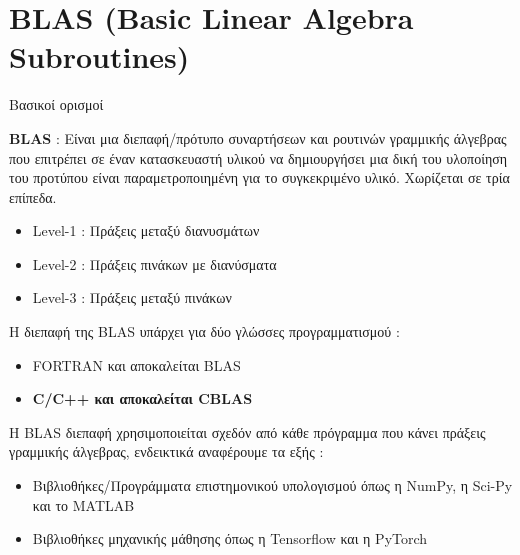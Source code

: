 \documentclass[10pt]{beamer}
\begin{document}
    \section{BLAS (Basic Linear Algebra Subroutines)}
    \begin{frame}{Βασικοί ορισμοί}
        \begin{block}{}
            \textbf{BLAS} : Είναι μια διεπαφή/πρότυπο συναρτήσεων και ρουτινών γραμμικής άλγεβρας που επιτρέπει σε έναν κατασκευαστή υλικού να δημιουργήσει μια δική του υλοποίηση του προτύπου είναι παραμετροποιημένη για το συγκεκριμένο υλικό. Χωρίζεται σε τρία επίπεδα.
            \begin{itemize}
                \item Level-1 : Πράξεις μεταξύ διανυσμάτων
                \item Level-2 : Πράξεις πινάκων με διανύσματα
                \item Level-3 : Πράξεις μεταξύ πινάκων
            \end{itemize}
        \end{block}
        \begin{block}{}
            H διεπαφή της BLAS υπάρχει για δύο γλώσσες προγραμματισμού :
            \begin{itemize}
                \item FORTRAN και αποκαλείται BLAS
                \item \textbf{C/C++ και αποκαλείται CBLAS}
            \end{itemize}
            Η BLAS διεπαφή χρησιμοποιείται σχεδόν από κάθε πρόγραμμα που κάνει πράξεις γραμμικής άλγεβρας, ενδεικτικά αναφέρουμε τα εξής :
            \begin{itemize}
                \item Βιβλιοθήκες/Προγράμματα επιστημονικού υπολογισμού όπως η NumPy, η Sci-Py και το MATLAB
                \item Βιβλιοθήκες μηχανικής μάθησης όπως η Tensorflow και η PyTorch
            \end{itemize}
        \end{block}
    \end{frame}
\end{document}
